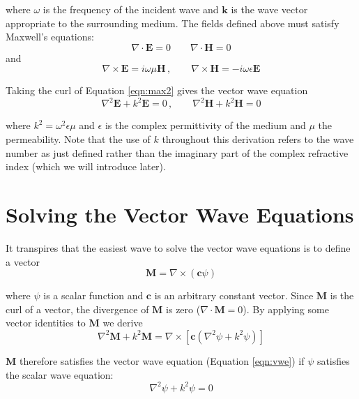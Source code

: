 \noindent where $\omega$ is the frequency of the incident wave and $\mathbf{k}$ is the wave vector appropriate to the surrounding medium.  The fields defined above must satisfy Maxwell's equations:
\begin{equation}
\label{eqn:max1}
\nabla \cdot \mathbf{E}=0 \quad \quad \nabla \cdot \mathbf{H}=0
\end{equation}
\noindent and
\begin{equation}
\label{eqn:max2}
\nabla \times \mathbf{E} = i\omega \mu \mathbf{H} \, , \quad \quad \nabla \times \mathbf{H} = -i\omega \epsilon \mathbf{E}
\end{equation}

\noindent Taking the curl of Equation \ref{eqn:max2}  gives the vector wave equation 
\begin{equation}
\label{eqn:vwe}
\nabla^2\mathbf{E}+k^2\mathbf{E}=0 \, , \quad \quad \nabla^2\mathbf{H}+k^2\mathbf{H}=0
\end{equation}

\noindent where $k^2=\omega^2\epsilon \mu$ and $\epsilon$ is the complex permittivity of the medium and $\mu$ the permeability.  Note that the use of $k$ throughout this derivation refers to the wave number as just defined rather than the imaginary part of the complex refractive index (which we will introduce later).    

\section{Solving the Vector Wave Equations}

It transpires that the easiest wave to solve the vector wave equations is to define a vector
\begin{equation}
\label{eqn:Mdef}
\mathbf{M}=\nabla \times (\mathbf{c}\psi)
\end{equation}

\noindent where $\psi$ is a scalar function and $\mathbf{c}$ is an arbitrary constant vector. Since $\mathbf{M}$ is the curl of a vector, the divergence of $\mathbf{M}$ is zero ($\nabla \cdot \mathbf{M} =0$).  By applying some vector identities to $\mathbf{M}$ we derive
\begin{equation}
\nabla^2\mathbf{M}+k^2\mathbf{M}=\nabla \times [\mathbf{c}(\nabla^2\psi+k^2\psi)]
\end{equation}

\noindent $\mathbf{M}$ therefore satisfies the vector wave equation (Equation \ref{eqn:vwe}) if $\psi$ satisfies the scalar wave equation:
\begin{equation}
\label{eqn:swe}
\nabla^2\psi+k^2\psi=0
\end{equation}

